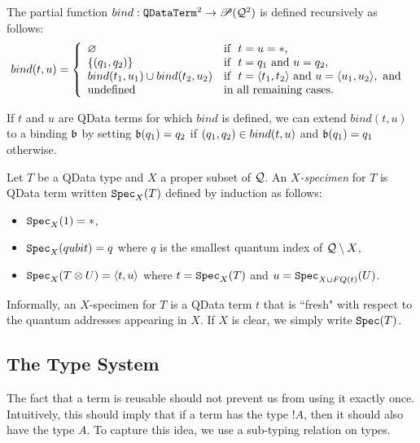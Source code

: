 \documentclass{article}
\begin{document}
\begin{definition}
The partial function $bind: \texttt{QDataTerm}^2\to {\mathscr{P}} (\mathcal{Q}^2)$ is 
defined recursively as follows:
\[
bind (t,u)= \left\{
  \begin{array}{ll}
    \varnothing & \mbox{if}~~ t=u=*, \\
    \{(q_1,q_2)\} & \mbox{if}~~ t=q_1 \mbox{ and } u=q_2, \\        
    bind (t_1,u_1) \cup bind (t_2,u_2) & 
      \mbox{if}~~ t=\langle t_1,t_2\rangle \mbox{ and } u=\langle u_1,u_2\rangle, \mbox{ and } \\
    \mbox{undefined} & \mbox{in all remaining cases.}
  \end{array}
\right.
\]
\end{definition}

\begin{remark}
\label{bind_extension}
If $t$ and $u$ are QData terms for which $bind$ is defined, we 
can extend $bind(t,u)$ to a binding $\mathfrak{b}$ by setting 
$\mathfrak{b} (q_1) = q_2$ if $(q_1,q_2)\in bind (t,u)$ and 
$\mathfrak{b} (q_1) = q_1$ otherwise.
\end{remark}

\begin{definition}
Let $T$ be a QData type and $X$ a proper subset of $\mathcal{Q}$. 
An \emph{$X$-specimen} for $T$ is QData term written $\texttt{Spec}_X(T)$ 
defined by induction as follows:
\begin{itemize}
  \item $\texttt{Spec}_X(1)=*$,
  \item $\texttt{Spec}_X(qubit)=q$ where $q$ is the smallest quantum 
  index of $\mathcal{Q}\setminus X$,
  \item $\texttt{Spec}_X(T\otimes U)=\langle t,u\rangle$ where $t=\texttt{Spec}_X(T)$ 
  and $u=\texttt{Spec}_{X\cup FQ(t)}(U)$.  
\end{itemize}
\end{definition}


Informally, an $X$-specimen for $T$ is a QData term $t$ that is 
``fresh" with respect to the quantum addresses appearing in $X$.
If $X$ is clear, we simply write $\texttt{Spec} (T)$.


\subsection{The Type System}

The fact that a term is reusable should not prevent us from 
using it exactly once. Intuitively, this should imply that if a 
term has the type $!A$, then it should also have the type $A$. 
To capture this idea, we use a sub-typing relation on types.
\end{document}
